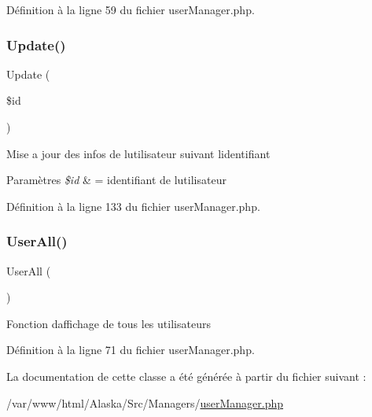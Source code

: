Définition à la ligne 59 du fichier user\+Manager.\+php.

\mbox{\label{class_src_1_1_managers_1_1user_manager_a82232b33fbfacdbdb8a8f49acaecf564}} 
\subsubsection{\texorpdfstring{Update()}{Update()}}
{\footnotesize\ttfamily Update (\begin{DoxyParamCaption}\item[{}]{\$id }\end{DoxyParamCaption})}

Mise a jour des infos de l\textquotesingle{}utilisateur suivant l\textquotesingle{}identifiant 
\begin{DoxyParams}{Paramètres}
{\em \$id} & = identifiant de l\textquotesingle{}utilisateur \\
\hline
\end{DoxyParams}


Définition à la ligne 133 du fichier user\+Manager.\+php.

\mbox{\label{class_src_1_1_managers_1_1user_manager_a0a377befd1052a5f989fd915af31373b}} 
\subsubsection{\texorpdfstring{User\+All()}{UserAll()}}
{\footnotesize\ttfamily User\+All (\begin{DoxyParamCaption}{ }\end{DoxyParamCaption})}

Fonction d\textquotesingle{}affichage de tous les utilisateurs 

Définition à la ligne 71 du fichier user\+Manager.\+php.



La documentation de cette classe a été générée à partir du fichier suivant \+:\begin{DoxyCompactItemize}
\item 
/var/www/html/\+Alaska/\+Src/\+Managers/\hyperlink{user_manager_8php}{user\+Manager.\+php}\end{DoxyCompactItemize}
